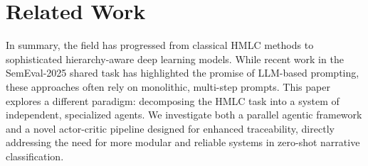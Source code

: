 \chapter{Related Work}







In summary, the field has progressed from classical HMLC methods to sophisticated hierarchy-aware deep learning models. While recent work in the SemEval-2025 shared task has highlighted the promise of LLM-based prompting, these approaches often rely on monolithic, multi-step prompts. This paper explores a different paradigm: decomposing the HMLC task into a system of independent, specialized agents. We investigate both a parallel agentic framework and a novel actor-critic pipeline designed for enhanced traceability, directly addressing the need for more modular and reliable systems in zero-shot narrative classification.